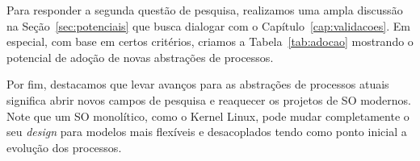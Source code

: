 Para responder a segunda questão de pesquisa, realizamos uma ampla discussão na
Seção~\ref{sec:potenciais} que busca dialogar com o
Capítulo~\ref{cap:validacoes}. Em especial, com base em certos critérios,
criamos a Tabela~\ref{tab:adocao} mostrando o potencial de adoção de novas
abstrações de processos.

Por fim, destacamos que levar avanços para as abstrações de processos atuais
significa abrir novos campos de pesquisa e reaquecer os projetos de SO
modernos. Note que um SO monolítico, como o Kernel Linux, pode mudar
completamente o seu \emph{design} para modelos mais flexíveis e desacoplados
tendo como ponto inicial a evolução dos processos. 

